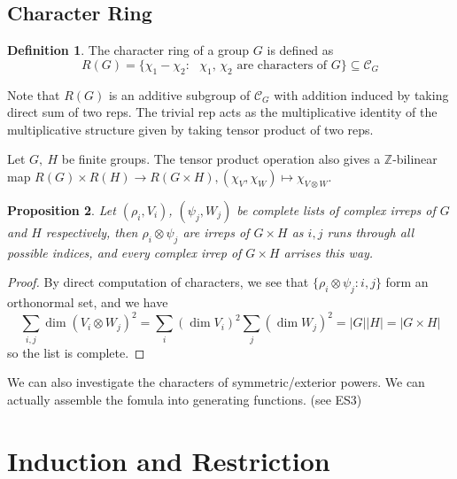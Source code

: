 \documentclass{article}
\theoremstyle{definition}
\newtheorem{defn}{Definition}[section]
\theoremstyle{remark}
\theoremstyle{plain}
\newtheorem{prop}[defn]{Proposition}
\newcommand{\ZZ}{\mathbb{Z}}
\begin{document}
\subsection{Character Ring}
\begin{defn}
    The character ring of a group $G$ is defined as
\[R(G)=\{\chi_1-\chi_2:\text{ $\chi_1$, $\chi_2$ are characters of $G$}\}\subseteq\mathcal{C}_G\]
\end{defn}
Note that $R(G)$ is an additive subgroup of $\mathcal{C}_G$ with addition induced by taking direct sum of two reps. The trivial rep acts as the multiplicative identity of the multiplicative structure given by taking tensor product of two reps.

Let $G,\ H$ be finite groups. The tensor product operation also gives a $\ZZ$-bilinear map
$R(G)\times R(H)\to R(G\times H), (\chi_V,\chi_W)\mapsto \chi_{V\otimes W}$.
\begin{prop}
    Let $(\rho_i,V_i)$, $(\psi_j,W_j)$ be complete lists of complex irreps of $G$ and $H$ respectively, then $\rho_i\otimes\psi_j$ are irreps of $G\times H$ as $i,j$ runs through all possible indices, and every complex irrep of $G\times H$ arrises this way.
\end{prop}
\begin{proof}
    By direct computation of characters, we see that $\{\rho_i\otimes\psi_j:i,j\}$ form an orthonormal set, and we have
    \[\sum_{i,j}\dim(V_i\otimes W_j)^2=\sum_i(\dim V_i)^2\sum_j(\dim W_j)^2=|G||H|=|G\times H|\]
    so the list is complete.
\end{proof}
We can also investigate the characters of symmetric/exterior powers. We can actually assemble the fomula into generating functions. (see ES3)

\section{Induction and Restriction}
\end{document}
